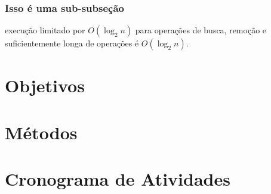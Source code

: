 \documentclass[a4paper,11pt,fleqn]{article}
\begin{document}
\subsubsection{Isso é uma sub-subseção}
\label{p:splay-tree}

execução limitado por $O(\log_2 n)$ para operações de busca, remoção e
suficientemente longa de operações é $O(\log_2 n)$.




\section{Objetivos}
\label{s:questoes-hipoteses}


\section{Métodos}
\label{s:metodos}




\section{Cronograma de Atividades}
\label{s:atividades-cronograma}




\end{document}
